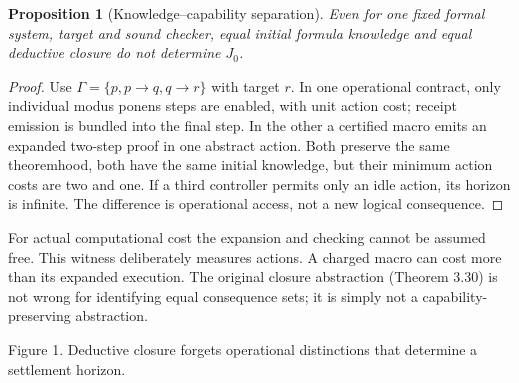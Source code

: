 \documentclass[11pt]{article}
\newtheorem{proposition}[theorem]{Proposition}
\theoremstyle{remark}\newtheorem{remark}[theorem]{Remark}
\begin{document}
\begin{proposition}[Knowledge--capability separation]
Even for one fixed formal system, target and sound checker, equal initial formula knowledge and equal deductive closure do not determine $J_0$.
\end{proposition}
\begin{proof}
Use $\Gamma=\{p,p\to q,q\to r\}$ with target $r$. In one operational contract, only individual modus ponens steps are enabled, with unit action cost; receipt emission is bundled into the final step. In the other a certified macro emits an expanded two-step proof in one abstract action. Both preserve the same theoremhood, both have the same initial knowledge, but their minimum action costs are two and one. If a third controller permits only an idle action, its horizon is infinite. The difference is operational access, not a new logical consequence.
\end{proof}
For actual computational cost the expansion and checking cannot be assumed free. This witness deliberately measures actions. A charged macro can cost more than its expanded execution. The original closure abstraction (Theorem 3.30) is not wrong for identifying equal consequence sets; it is simply not a capability-preserving abstraction.

\begin{center}

\small Figure 1. Deductive closure forgets operational distinctions that determine a settlement horizon.
\end{center}
\end{document}
